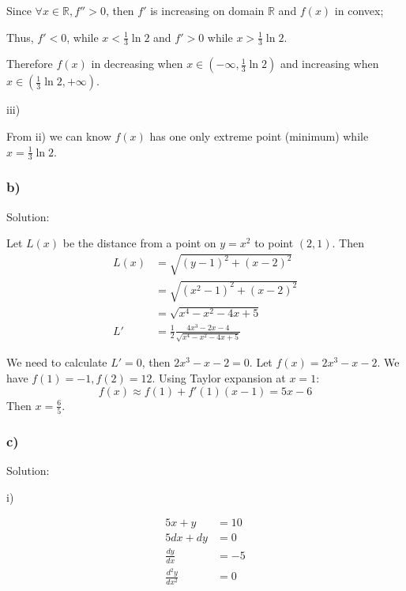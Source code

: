 \documentclass[letterpaper, 11pt]{article}
\newcommand{\1}{\mathds{1}}	%
\theoremstyle{definition}
\begin{document}
  Since $\forall x \in \mathbb{R}, f'' > 0$, then $f'$ is increasing on domain $\mathbb{R}$ and $f(x)$ in convex;

  Thus, $f' < 0$, while $x < \frac{1}{3}\ln2$ and $f' > 0$ while $ x > \frac{1}{3}\ln2$.

  Therefore $f(x)$ in decreasing when $x \in (-\infty, \frac{1}{3}\ln2)$ and increasing when $x \in (\frac{1}{3}\ln2, +\infty)$.

  iii)

  From ii) we can know $f(x)$ has one only extreme point (minimum) while $x = \frac{1}{3}\ln2$.


  \subsubsection*{b)}

  Solution:

  Let $L(x)$ be the distance from a point on $y=x ^{2}$ to point $(2,1)$. Then
  \begin{align*}
    L(x) & = \sqrt{(y - 1) ^{2} + (x-2) ^{2}}                                 \\
         & = \sqrt{(x ^{2} - 1) ^{2} + (x-2) ^{2}}                            \\
         & = \sqrt{x ^{4} - x ^{2} -4x + 5}                                   \\
    L'   & = \frac{1}{2}\frac{4x ^{3} -2x -4}{\sqrt{x ^{4} - x ^{2} -4x + 5}}
  \end{align*}

  We need to calculate $L'=0$, then $2x ^{3}-x -2=0$. Let $f(x) = 2x ^{3}-x-2$.
  We have $f(1)=-1, f(2) = 12$.
  Using Taylor expansion at $x=1$:\begin{equation*}
    f(x) \approx f(1) + f'(1)(x-1) = 5x-6
  \end{equation*}
  Then $x = \frac{6}{5}$.

  \subsubsection*{c)}

  Solution:

  i)

  \begin{align*}
    5x + y                  & = 10 \\
    5dx + dy                & = 0  \\
    \frac{dy}{dx}           & = -5 \\
    \frac{d ^{2}y}{dx ^{2}} & = 0
  \end{align*}
\end{document}
